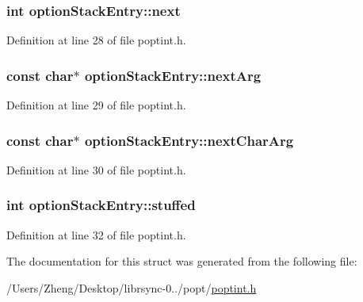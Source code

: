 \subsubsection[{next}]{\setlength{\rightskip}{0pt plus 5cm}int option\+Stack\+Entry\+::next}\label{structoption_stack_entry_abfe5c6a29f094c148cff402fba93268e}


Definition at line 28 of file poptint.\+h.

\hypertarget{structoption_stack_entry_aa67f80d13f4b7d97fb4754b9d9eaf55a}{}
\subsubsection[{next\+Arg}]{\setlength{\rightskip}{0pt plus 5cm}const char$\ast$ option\+Stack\+Entry\+::next\+Arg}\label{structoption_stack_entry_aa67f80d13f4b7d97fb4754b9d9eaf55a}


Definition at line 29 of file poptint.\+h.

\hypertarget{structoption_stack_entry_ab0485d4d1b9e5c1f9dd8ca4c0fda3478}{}
\subsubsection[{next\+Char\+Arg}]{\setlength{\rightskip}{0pt plus 5cm}const char$\ast$ option\+Stack\+Entry\+::next\+Char\+Arg}\label{structoption_stack_entry_ab0485d4d1b9e5c1f9dd8ca4c0fda3478}


Definition at line 30 of file poptint.\+h.

\hypertarget{structoption_stack_entry_a585e45e37b8f7a899434b0f94bd009b7}{}
\subsubsection[{stuffed}]{\setlength{\rightskip}{0pt plus 5cm}int option\+Stack\+Entry\+::stuffed}\label{structoption_stack_entry_a585e45e37b8f7a899434b0f94bd009b7}


Definition at line 32 of file poptint.\+h.



The documentation for this struct was generated from the following file\+:\begin{DoxyCompactItemize}
\item 
/\+Users/\+Zheng/\+Desktop/librsync-\/0../popt/\hyperlink{poptint_8h}{poptint.\+h}\end{DoxyCompactItemize}
